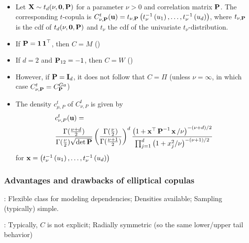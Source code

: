 \begin{itemize}[leftmargin=*]
    \item Let $\operatorname{\boldsymbol{\mathbf{X}}} \sim t_{d}(\nu, \operatorname{\boldsymbol{\mathbf{0}}}, \boldsymbol{\mathbf{P}})$ for a parameter $\nu>0$ and correlation matrix $\boldsymbol{\mathbf{P}}$.
The corresponding $t$-copula is
$
C_{\nu, \boldsymbol{\mathbf{P}}}^{t}(\operatorname{\boldsymbol{\mathbf{u}}}) =t_{\nu, \boldsymbol{\mathbf{P}}}\left(t_{\nu}^{-1}\left(u_{1}\right), \ldots, t_{\nu}^{-1}\left(u_{d}\right)\right)
$, where $t_{\nu, \boldsymbol{\mathbf{P}}}$ is the cdf of $t_{d}(\nu, \operatorname{\boldsymbol{\mathbf{0}}}, \boldsymbol{\mathbf{P}})$ and $t_{\nu}$ the cdf of the univariate $t_{\nu}$-distribution.
    \item If $\boldsymbol{\mathbf{P}}=\operatorname{\boldsymbol{\mathbf{1}}}\operatorname{\boldsymbol{\mathbf{1}}}^{\operatorname{\top}}$, then $C=M$ ()
    \item If $d=2$ and $\boldsymbol{\mathbf{P}}_{12}=-1$, then $C=W$ ()
    \item However, if $\boldsymbol{\mathbf{P}}=\operatorname{\boldsymbol{\mathbf{I}}}_{d}$, it does not follow that $C=\Pi$ (unless $\nu=\infty$, in which case $C_{\nu, \boldsymbol{\mathbf{P}}}^{t}=C_{\boldsymbol{\mathbf{P}}}^{Ga}$)
    \item The density $c_{\mu, P}^{t}$ of $C_{\nu, P}^{t}$ is given by
$$
\begin{aligned}
&c_{\nu, P}^{t}(\operatorname{\boldsymbol{\mathbf{u}}})= \\
&\frac{\Gamma(\frac{\nu+d}{2})}{\Gamma(\frac{\nu}{2}) \sqrt{\operatorname{det} \boldsymbol{\mathbf{P}}}}\left(\frac{\Gamma(\frac{\nu}{2})}{\Gamma(\frac{\nu+1}{2})}\right)^{d} \frac{\left(1+\operatorname{\boldsymbol{\mathbf{x}}}^{\operatorname{\top}} \boldsymbol{\mathbf{P}}^{-1} \operatorname{\boldsymbol{\mathbf{x}}} / \nu\right)^{-(\nu+d) / 2}}{\prod_{j=1}^{d}\left(1+x_{j}^{2} / \nu\right)^{-(\nu+1) / 2}}
\end{aligned}
$$
for $\operatorname{\boldsymbol{\mathbf{x}}}=\left(t_{\nu}^{-1}\left(u_{1}\right), \ldots, t_{\nu}^{-1}\left(u_{d}\right)\right)$
\end{itemize}



\subsubsection*{Advantages and drawbacks of elliptical copulas}
: Flexible class for modeling dependencies; Densities available;  Sampling (typically) simple.

: Typically, $C$ is not explicit;  Radially symmetric (so the same
lower/upper tail behavior)









